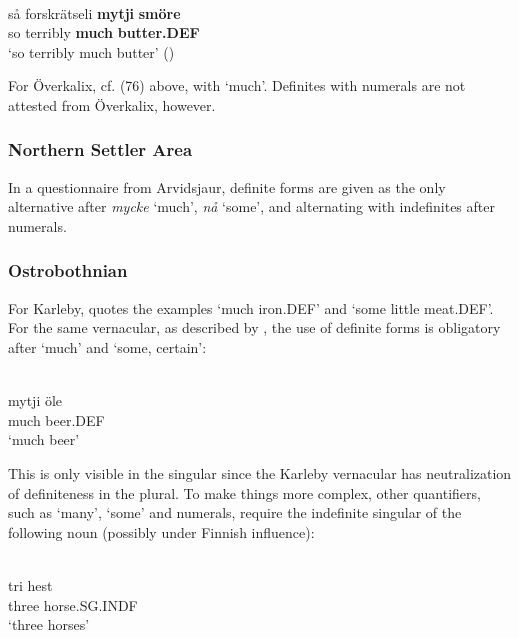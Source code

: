 \z

\ea \label{} 
\\
\gll så  forskrätseli  \textbf{mytji} \textbf{smöre}\\
so  terribly  \textbf{much} \textbf{butter.DEF}\\
\glt ‘so terribly much butter’ (\citet{Stenberg1971})

\z

For Överkalix, cf. (76) above, with ‘much’. Definites with numerals are not attested from Överkalix, however.

\subsubsection{Northern Settler Area}
In a questionnaire from Arvidsjaur, definite forms are given as the only alternative after \textit{mycke} ‘much’, \textit{nå} ‘some’, and alternating with indefinites after numerals.

\subsubsection{Ostrobothnian}
 For Karleby, \citet[94]{Hagfors1891} quotes the examples  ‘much iron.DEF’ and  ‘some little meat.DEF’. For the same vernacular, as described by \citet{Vangsnes2003}, the use of definite forms is obligatory after  ‘much’ and  ‘some, certain’:

\ea \label{} 
\\
\gll mytji  öle\\
much  beer.DEF\\
\glt ‘much beer’

\z

This is only visible in the singular since the Karleby vernacular has neutralization of definiteness in the plural. To make things more complex, other quantifiers, such as  ‘many’,  ‘some’ and numerals, require the indefinite singular of the following noun (possibly under Finnish influence):

\ea \label{} 
\\
\gll tri  hest\\
three  horse.SG.INDF\\
\glt ‘three horses’

